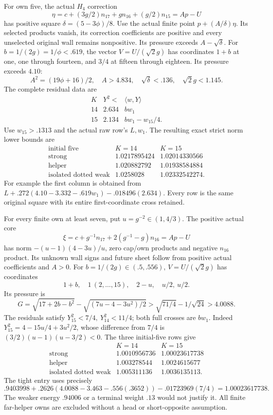 \documentclass[11pt]{article}
\theoremstyle{definition}
\theoremstyle{remark}
\newcommand{\ip}[2]{\langle #1,#2\rangle}
\begin{document}
For own five, the actual \(H_4\) correction
\[
 \eta=c+(3g/2)n_{17}+gn_{16}+(g/2)n_{15}=A p-U
\]
has positive square \(\delta=(5-3\phi)/8\).
Use the actual finite point \(p+(A/\delta)\eta\).
Its selected products vanish, its correction coefficients are
positive and every unselected original wall remains nonpositive.
Its pressure exceeds \(A-\sqrt\delta\).
For \(b=1/(2g)=1/\phi<.619\), the vector \(V=U/(\sqrt2g)\)
has coordinates \(1+b\) at one, one through fourteen, and
\(3/4\) at fifteen through eighteen. Its pressure exceeds \(4.10\):
\[
 A^2=(19\phi+16)/2,\quad
 A>4.834,\quad \sqrt\delta<.136,\quad \sqrt2g<1.145.
\]
The complete residual data are
\[
\begin{array}{c|cc}
K&Y^2<&\ip wY\\ \hline
14&2.634&bw_1\\
15&2.134&bw_1-w_{15}/4 .
\end{array}
\]
Use \(w_{15}>.1313\) and the actual raw row's \(L,w_1\).
The resulting exact strict norm lower bounds are
\[
\begin{array}{c|cc}
\text{initial five}&K=14&K=15\\ \hline
\text{strong}&1.0217895424&1.02014330566\\
\text{helper}&1.020882792&1.01938584884\\
\text{isolated dotted weak}&1.0258028&1.02332542274 .
\end{array}
\]
For example the first column is obtained from
\(L+.272(4.10-3.332-.619w_1)-.018496(2.634)\).
Every row is the same original square with its entire first-coordinate
cross retained.

For every finite own at least seven, put \(u=g^{-2}\in(1,4/3)\).
The positive actual core
\[
 \xi=c+g^{-1}n_{17}+2(g^{-1}-g)n_{16}=A p-U
\]
has norm \(-(u-1)(4-3u)/u\), zero cap/own products
and negative \(n_{16}\) product. Its unknown wall signs and
future sheet follow from positive actual coefficients and \(A>0\).
For \(b=1/(2g)\in(.5,.556)\), \(V=U/(\sqrt2g)\)
has coordinates
\[
 1+b,\quad 1\ (2,\ldots,15),\quad 2-u,\quad u/2,\ u/2 .
\]
Its pressure is
\[
 G=\sqrt{17+2b-b^2}-\sqrt{(7u-4-3u^2)/2}
   >\sqrt{71/4}-1/\sqrt{24}>4.0088 .
\]
The residuals satisfy \(Y_{15}^2<7/4,\ Y_{14}^2<11/4\);
both full crosses are \(bw_1\).
Indeed
\(Y_{15}^2=4-15u/4+3u^2/2\), whose difference from \(7/4\)
is \((3/2)(u-1)(u-3/2)<0\).
The three initial-five rows give
\[
\begin{array}{c|cc}
 &K=14&K=15\\ \hline
\text{strong}&1.0010956736&1.00023617738\\
\text{helper}&1.003278544&1.0024615677\\
\text{isolated dotted weak}&1.005311136&1.0036135113 .
\end{array}
\]
The tight entry uses precisely
\[
 .9403998+.2626(4.0088-3.463-.556(.3652))
       -.01723969(7/4)=1.00023617738.
\]
The weaker energy \(.94006\) or a terminal weight \(.13\)
would not justify it. All finite far-helper owns are excluded
without a head or short-opposite assumption.
\end{document}
